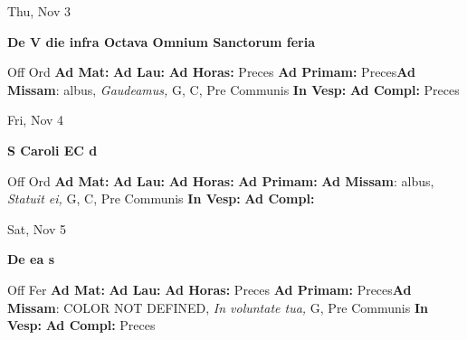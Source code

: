 \documentclass[10pt]{memoir}
\begin{document}
\begin{center}
\begin{minipage}{3.5in}
\vspace{2em}
\begin{center}Thu, Nov 3
\end{center}
\textbf{ \large De V die infra Octava Omnium Sanctorum
\textnormal{\normalsize feria}}

\begin{justify}Off Ord
\textbf{Ad Mat: }
\textbf{Ad Lau: }
\textbf{Ad Horas: }Preces
\textbf{Ad Primam: }Preces\textbf{Ad Missam}: albus, \textit{Gaudeamus,} G, C, Pre Communis
\textbf{In Vesp: }
\textbf{Ad Compl: }Preces
\end{justify}
\end{minipage}
\end{center}

\begin{center}
\begin{minipage}{3.5in}
\vspace{2em}
\begin{center}Fri, Nov 4
\end{center}
\textbf{ \large S Caroli EC
\textnormal{\normalsize d}}

\begin{justify}Off Ord
\textbf{Ad Mat: }
\textbf{Ad Lau: }
\textbf{Ad Horas: }
\textbf{Ad Primam: }\textbf{Ad Missam}: albus, \textit{Statuit ei,} G, C, Pre Communis
\textbf{In Vesp: }
\textbf{Ad Compl: }
\end{justify}
\end{minipage}
\end{center}

\begin{center}
\begin{minipage}{3.5in}
\vspace{2em}
\begin{center}Sat, Nov 5
\end{center}
\textbf{ \large De ea
\textnormal{\normalsize s}}

\begin{justify}Off Fer
\textbf{Ad Mat: }
\textbf{Ad Lau: }
\textbf{Ad Horas: }Preces
\textbf{Ad Primam: }Preces\textbf{Ad Missam}: COLOR NOT DEFINED, \textit{In voluntate tua,} G, Pre Communis
\textbf{In Vesp: }
\textbf{Ad Compl: }Preces
\end{justify}
\end{minipage}
\end{center}
\end{document}
